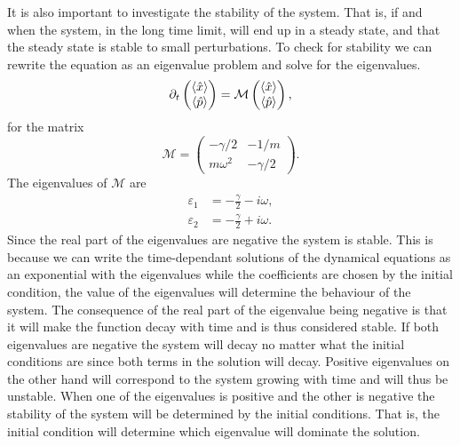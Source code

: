 It is also important to investigate the stability of the system. That is, if and when the system, in the long time limit, will end up in a steady state, and that the steady state is stable to small perturbations. To check for stability we can rewrite the equation as an eigenvalue problem and solve for the eigenvalues.
\begin{equation}
    \partial_t 
    \begin{pmatrix}
        \expval{\hat{x}}\\
        \expval{\hat{p}}    
    \end{pmatrix}
    = \mathcal{M}
    \begin{pmatrix}
        \expval{\hat{x}}\\
        \expval{\hat{p}} 
    \end{pmatrix},
\end{equation}
for the matrix
\begin{equation}
    \mathcal{M} = \begin{pmatrix}
        -\gamma/2 & -1/m \\
        m\omega^2 & -\gamma/2
    \end{pmatrix}.
\end{equation}
The eigenvalues of $\mathcal{M}$ are 
\begin{align}
    \varepsilon_1 &= -\frac{\gamma}{2} - i\omega,\\
    \varepsilon_2 &= -\frac{\gamma}{2} + i\omega.
\end{align}
Since the real part of the eigenvalues are negative the system is stable. This is because we can write the time-dependant solutions of the dynamical equations as an exponential with the eigenvalues while the coefficients are chosen by the initial condition, the value of the eigenvalues will determine the behaviour of the system. The consequence of the real part of the eigenvalue being negative is that it will make the function decay with time and is thus considered stable. If both eigenvalues are negative the system will decay no matter what the initial conditions are since both terms in the solution will decay. Positive eigenvalues on the other hand will correspond to the system growing with time and will thus be unstable. When one of the eigenvalues is positive and the other is negative the stability of the system will be determined by the initial conditions. That is, the initial condition will determine which eigenvalue will dominate the solution.

